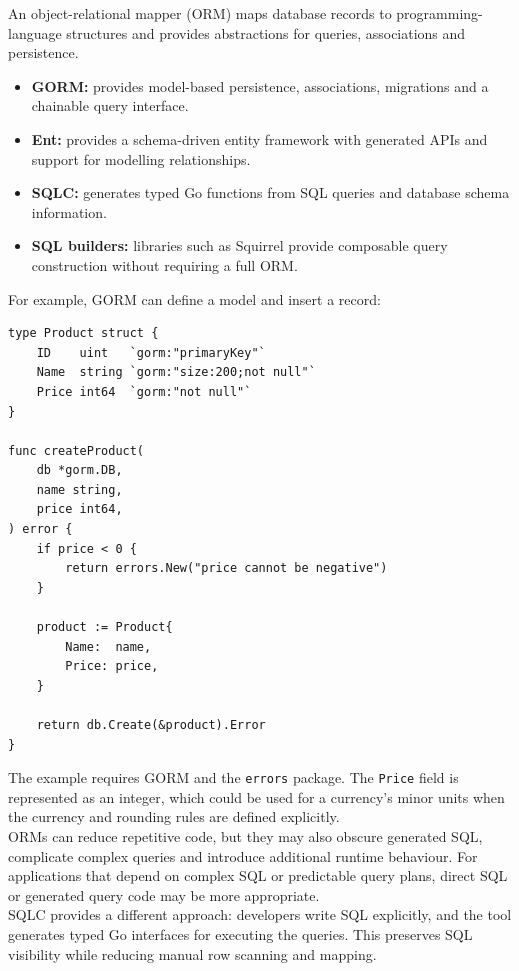 An object-relational mapper (ORM) maps database records to programming-language structures and provides abstractions for queries, associations and persistence.

\begin{itemize}
    \item \textbf{GORM:} provides model-based persistence, associations, migrations and a chainable query interface.
    \item \textbf{Ent:} provides a schema-driven entity framework with generated APIs and support for modelling relationships.
    \item \textbf{SQLC:} generates typed Go functions from SQL queries and database schema information.
    \item \textbf{SQL builders:} libraries such as Squirrel provide composable query construction without requiring a full ORM.
\end{itemize}

For example, GORM can define a model and insert a record:

\begin{lstlisting}
type Product struct {
    ID    uint   `gorm:"primaryKey"`
    Name  string `gorm:"size:200;not null"`
    Price int64  `gorm:"not null"`
}

func createProduct(
    db *gorm.DB,
    name string,
    price int64,
) error {
    if price < 0 {
        return errors.New("price cannot be negative")
    }

    product := Product{
        Name:  name,
        Price: price,
    }

    return db.Create(&product).Error
}
\end{lstlisting}

The example requires GORM and the \texttt{errors} package. The \texttt{Price} field is represented as an integer, which could be used for a currency's minor units when the currency and rounding rules are defined explicitly.\\

ORMs can reduce repetitive code, but they may also obscure generated SQL, complicate complex queries and introduce additional runtime behaviour. For applications that depend on complex SQL or predictable query plans, direct SQL or generated query code may be more appropriate.\\

SQLC provides a different approach: developers write SQL explicitly, and the tool generates typed Go interfaces for executing the queries. This preserves SQL visibility while reducing manual row scanning and mapping.\\

